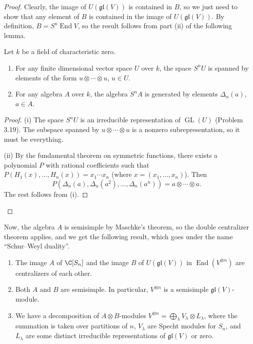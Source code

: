 \begin{proof}
Clearly, the image of $U(\mathfrak{gl}(V))$ is contained in $B$, so we just need to show that any element of $B$ is contained in the image of $U(\mathfrak{gl}(V))$. By definition, $B=S^n\operatorname{End}V$, so the result follows from part (ii) of the following lemma.
\begin{lemma}[4.56]
Let $k$ be a field of characteristic zero.
\begin{enumerate}[label=(\roman*)]
\item For any finite dimensional vector space $U$ over $k$, the space $S^nU$ is spanned by elements of the form $u\otimes\cdots\otimes u$, $u\in U$.
\item For any algebra $A$ over $k$, the algebra $S^nA$ is generated by elements $\Delta_n(a)$, $a\in A$.
\end{enumerate}
\end{lemma}
\begin{proof}
(i) The space $S^nU$ is an irreducible representation of $\operatorname{GL}(U)$ (Problem 3.19). The subspace spanned by $u\otimes\cdots\otimes u$ is a nonzero subrepresentation, so it must be everything.

(ii) By the fundamental theorem on symmetric functions, there exists a polynomial $P$ with rational coefficients such that $P(H_1(x),\ldots,H_n(x))=x_1\cdots x_n$ (where $x=(x_1,\ldots,x_n)$). Then
\[
P(\Delta_n(a),\Delta_n(a^2),\ldots,\Delta_n(a^n))=a\otimes\cdots\otimes a.
\]
The rest follows from (i).
\end{proof}
\end{proof}
Now, the algebra $A$ is semisimple by Maschke's theorem, so the double centralizer theorem applies, and we get the following result, which goes under the name ``Schur--Weyl duality''.
\begin{theorem}[4.57]
\begin{enumerate}[label=(\roman*)]
\item The image $A$ of $\C[S_n]$ and the image $B$ of $U(\mathfrak{gl}(V))$ in $\operatorname{End}(V^{\otimes n})$ are centralizers of each other.
\item Both $A$ and $B$ are semisimple. In particular, $V^{\otimes n}$ is a semisimple $\mathfrak{gl}(V)$-module.
\item We have a decomposition of $A\otimes B$-modules $V^{\otimes n}=\bigoplus_\lambda V_\lambda\otimes L_\lambda$, where the summation is taken over partitions of $n$, $V_\lambda$ are Specht modules for $S_n$, and $L_\lambda$ are some distinct irreducible representations of $\mathfrak{gl}(V)$ or zero.
\end{enumerate}
\end{theorem}
